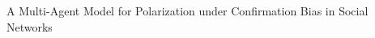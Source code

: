 \documentclass[preview]{standalone}
\begin{document}
A Multi-Agent Model for Polarization under Confirmation Bias in Social Networks\\
\end{document}
